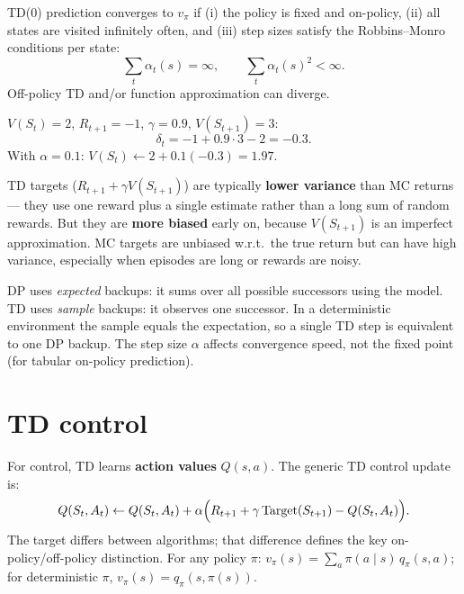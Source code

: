\documentclass[11pt, oneside]{book}
\begin{document}
\begin{thmbox}[title={Convergence of Tabular On-Policy TD(0)}]
TD(0) prediction converges to $v_\pi$ if (i) the policy is fixed and
on-policy, (ii) all states are visited infinitely often, and (iii) step sizes
satisfy the Robbins--Monro conditions per state:
\[
  \sum_t \alpha_t(s) = \infty, \qquad \sum_t \alpha_t(s)^2 < \infty.
\]
Off-policy TD and/or function approximation can diverge.
\end{thmbox}

\begin{exbox}[title={TD(0) Update Calculation}]
$V(S_t)=2$, $R_{t+1}=-1$, $\gamma=0.9$, $V(S_{t+1})=3$:
\[
  \delta_t = -1 + 0.9\cdot3 - 2 = -0.3.
\]
With $\alpha=0.1$: $V(S_t) \leftarrow 2 + 0.1(-0.3) = 1.97$.
\end{exbox}

\begin{intbox}[title={Bias--Variance Trade-off}]
TD targets ($R_{t+1} + \gamma V(S_{t+1})$) are typically
\textbf{lower variance} than MC returns --- they use one reward plus a single
estimate rather than a long sum of random rewards. But they are
\textbf{more biased} early on, because $V(S_{t+1})$ is an imperfect
approximation. MC targets are unbiased w.r.t.\ the true return but can have
high variance, especially when episodes are long or rewards are noisy.
\end{intbox}

\begin{notebox}[title={TD vs DP (Exam Nuance)}]
DP uses \emph{expected} backups: it sums over all possible successors using
the model. TD uses \emph{sample} backups: it observes one successor.
In a deterministic environment the sample equals the expectation, so a single
TD step is equivalent to one DP backup. The step size $\alpha$ affects
convergence speed, not the fixed point (for tabular on-policy prediction).
\end{notebox}

\section{TD control}

For control, TD learns \textbf{action values} $Q(s,a)$. The generic TD
control update is:
\[
  Q(S_t,A_t) \leftarrow Q(S_t,A_t)
    + \alpha\Bigl(R_{t+1} + \gamma\,\text{Target}(S_{t+1}) - Q(S_t,A_t)\Bigr).
\]
The target differs between algorithms; that difference defines the key
on-policy/off-policy distinction. For any policy $\pi$:
$v_\pi(s) = \sum_a \pi(a\mid s)\,q_\pi(s,a)$; for deterministic $\pi$,
$v_\pi(s) = q_\pi(s,\pi(s))$.
\end{document}
